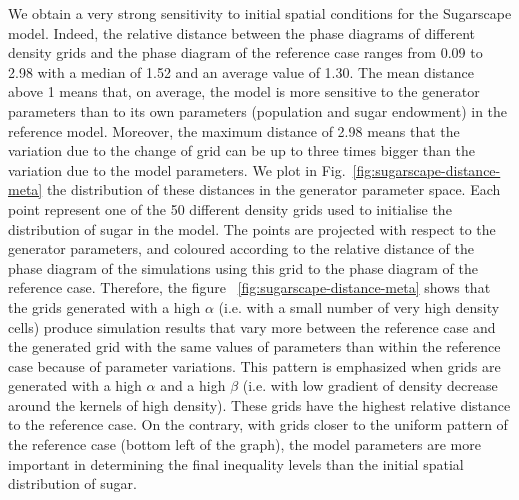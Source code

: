 \documentclass{JASSS}
\begin{document}
We obtain a very strong sensitivity to initial spatial conditions for the Sugarscape model. Indeed, the relative distance between the phase diagrams of different density grids and the phase diagram of the reference case ranges from 0.09 to 2.98 with a median of 1.52 and an average value of 1.30. The mean distance above 1 means that, on average, the model is more sensitive to the generator parameters than to its own parameters (population and sugar endowment) in the reference model. Moreover, the maximum distance of 2.98 means that the variation due to the change of grid can be up to three times bigger than the variation due to the model parameters. We plot in Fig.~\ref{fig:sugarscape-distance-meta} the distribution of these distances in the generator parameter space. Each point represent one of the 50 different density grids used to initialise the distribution of sugar in the model. The points are projected with respect to the generator parameters, and coloured according to the relative distance of the phase diagram of the simulations using this grid to the phase diagram of the reference case. Therefore, the figure ~\ref{fig:sugarscape-distance-meta} shows that the grids generated with a high $\alpha$ (i.e. with a small number of very high density cells) produce simulation results that vary more between the reference case and the generated grid with the same values of parameters than within the reference case because of parameter variations. This pattern is emphasized when grids are generated with a high $\alpha$ and a high $\beta$ (i.e. with low gradient of density decrease around the kernels of high density). These grids have the highest relative distance to the reference case. On the contrary, with grids closer to the uniform pattern of the reference case (bottom left of the graph), the model parameters are more important in determining the final inequality levels than the initial spatial distribution of sugar. 
\end{document}
